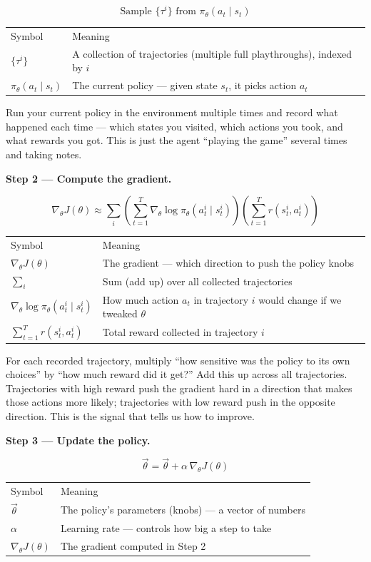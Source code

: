 \[
  \text{Sample } \{\tau^i\} \text{ from } \pi_\theta(a_t\mid s_t)
\]

\begin{tabular}{ll}
  Symbol & Meaning \\[4pt]
  $\{\tau^i\}$ & A collection of trajectories (multiple full playthroughs), indexed by $i$ \\
  $\pi_\theta(a_t\mid s_t)$ & The current policy --- given state $s_t$, it picks action $a_t$ \\
\end{tabular}

\medskip
Run your current policy in the environment multiple times and record what happened each time ---
which states you visited, which actions you took, and what rewards you got. This is just the
agent ``playing the game'' several times and taking notes.

\medskip
\textbf{Step 2 --- Compute the gradient.}

\[
  \nabla_\theta J(\theta)
  \approx \sum_i
    \left(\sum_{t=1}^T\nabla_\theta\log\pi_\theta(a_t^i\mid s_t^i)\right)
    \left(\sum_{t=1}^T r(s_t^i,a_t^i)\right)
\]

\begin{tabular}{ll}
  Symbol & Meaning \\[4pt]
  $\nabla_\theta J(\theta)$ & The gradient --- which direction to push the policy knobs \\
  $\sum_i$ & Sum (add up) over all collected trajectories \\
  $\nabla_\theta\log\pi_\theta(a_t^i\mid s_t^i)$ & How much action $a_t$ in trajectory $i$ would change if we tweaked $\theta$ \\
  $\sum_{t=1}^T r(s_t^i,a_t^i)$ & Total reward collected in trajectory $i$ \\
\end{tabular}

\medskip
For each recorded trajectory, multiply ``how sensitive was the policy to its own choices'' by
``how much reward did it get?'' Add this up across all trajectories. Trajectories with high
reward push the gradient hard in a direction that makes those actions more likely; trajectories
with low reward push in the opposite direction. This is the signal that tells us how to improve.

\medskip
\textbf{Step 3 --- Update the policy.}

\[
  \vec{\theta} = \vec{\theta} + \alpha\,\nabla_\theta J(\theta)
\]

\begin{tabular}{ll}
  Symbol & Meaning \\[4pt]
  $\vec{\theta}$ & The policy's parameters (knobs) --- a vector of numbers \\
  $\alpha$ & Learning rate --- controls how big a step to take \\
  $\nabla_\theta J(\theta)$ & The gradient computed in Step 2 \\
\end{tabular}

